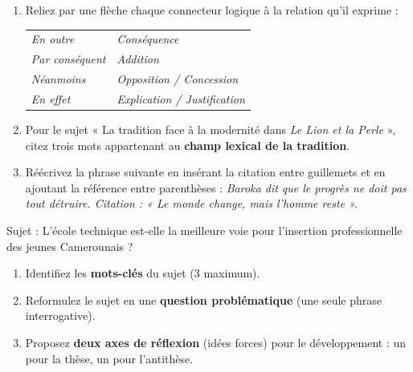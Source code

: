 \documentclass[11pt]{article}
\begin{document}
\begin{exercice}
\begin{enumerate}
    \item Reliez par une flèche chaque connecteur logique à la relation qu'il exprime :
    \begin{tabular}{ll}
    \textit{En outre} & \textit{Conséquence} \\
    \textit{Par conséquent} & \textit{Addition} \\
    \textit{Néanmoins} & \textit{Opposition / Concession} \\
    \textit{En effet} & \textit{Explication / Justification} \\
    \end{tabular}
    \item Pour le sujet « La tradition face à la modernité dans \textit{Le Lion et la Perle} », citez trois mots appartenant au \textbf{champ lexical de la tradition}.
    \item Réécrivez la phrase suivante en insérant la citation entre guillemets et en ajoutant la référence entre parenthèses : \textit{Baroka dit que le progrès ne doit pas tout détruire. Citation : « Le monde change, mais l'homme reste ».}
\end{enumerate}
\end{exercice}

\begin{exercice}
Sujet : \og L'école technique est-elle la meilleure voie pour l'insertion professionnelle des jeunes Camerounais ? \fg

\begin{enumerate}
    \item Identifiez les \textbf{mots-clés} du sujet (3 maximum).
    \item Reformulez le sujet en une \textbf{question problématique} (une seule phrase interrogative).
    \item Proposez \textbf{deux axes de réflexion} (idées forces) pour le développement : un pour la thèse, un pour l'antithèse.
\end{enumerate}
\end{exercice}
\end{document}
